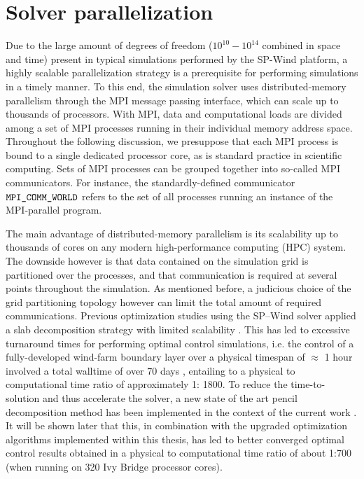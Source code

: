 \section{Solver parallelization}\label{sec:meth_par}
Due to the large amount of degrees of freedom ($10^{10} - 10^{14}$ combined in space and time) present in typical simulations performed by the SP-Wind platform, a highly scalable parallelization strategy is a prerequisite for performing simulations in a timely manner. To this end, the simulation solver uses distributed-memory parallelism through the MPI message passing interface, which can scale up to thousands of processors. With MPI, data and computational loads are divided among a set of MPI processes running in their individual memory address space. Throughout the following discussion, we presuppose that each MPI process is bound to a single dedicated processor core, as is standard practice in scientific computing. Sets of MPI processes can be grouped together into so-called MPI communicators. For instance, the standardly-defined communicator $\verb|MPI_COMM_WORLD|$ refers to the set of all processes running an instance of the MPI-parallel program.

The main advantage of distributed-memory parallelism is its scalability up to thousands of cores on any modern high-performance computing (HPC) system. The downside however is
that data contained on the simulation grid is partitioned over the processes, and that communication is required at several points throughout the
simulation. As mentioned before, a judicious choice of the grid partitioning topology however can limit the total amount of required communications.
Previous optimization studies using the SP--Wind solver applied a slab decomposition strategy with limited scalability \citep{delport2009constrained,
goit2015optimal}. This has led to excessive turnaround times for performing optimal control simulations, i.e. the control of a fully-developed
wind-farm boundary layer over a physical timespan of $\approx$ 1 hour involved a total walltime of over 70 days \citep{goit2015optimal}, entailing to
a physical to computational time ratio of approximately 1: 1800. To reduce the time-to-solution and thus accelerate the solver, a new state of the art
pencil decomposition method has been implemented in the context of the current work \citep{li20102decomp}. It will be shown later that this, in
combination with the upgraded optimization algorithms implemented within this thesis, has led to better converged optimal control results obtained in
a physical to computational time ratio of about 1:700 (when running on 320 Ivy Bridge processor cores).

